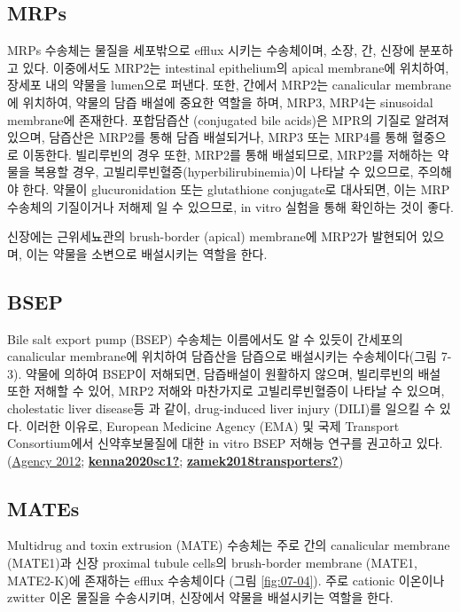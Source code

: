 \documentclass[
  11pt,
  krantz2, a4paper, twoside]{krantz}
\begin{document}
\hypertarget{mrps}{%
\subsection{MRPs}\label{mrps}}

MRPs 수송체는 물질을 세포밖으로 efflux 시키는 수송체이며, 소장, 간,
신장에 분포하고 있다. 이중에서도 MRP2는 intestinal epithelium의 apical
membrane에 위치하여, 장세포 내의 약물을 lumen으로 퍼낸다. 또한, 간에서
MRP2는 canalicular membrane에 위치하여, 약물의 담즙 배설에 중요한 역할을
하며, MRP3, MRP4는 sinusoidal membrane에 존재한다. 포합담즙산
(conjugated bile acids)은 MPR의 기질로 알려져 있으며, 담즙산은 MRP2를
통해 담즙 배설되거나, MRP3 또는 MRP4를 통해 혈중으로 이동한다.
빌리루빈의 경우 또한, MRP2를 통해 배설되므로, MRP2를 저해하는 약물을
복용할 경우, 고빌리루빈혈증(hyperbilirubinemia)이 나타날 수 있으므로,
주의해야 한다. 약물이 glucuronidation 또는 glutathione conjugate로
대사되면, 이는 MRP 수송체의 기질이거나 저해제 일 수 있으므로, in vitro
실험을 통해 확인하는 것이 좋다.

신장에는 근위세뇨관의 brush-border (apical) membrane에 MRP2가 발현되어
있으며, 이는 약물을 소변으로 배설시키는 역할을 한다.

\hypertarget{bsep}{%
\subsection{BSEP}\label{bsep}}

Bile salt export pump (BSEP) 수송체는 이름에서도 알 수 있듯이 간세포의
canalicular membrane에 위치하여 담즙산을 담즙으로 배설시키는
수송체이다(그림 7-3). 약물에 의하여 BSEP이 저해되면, 담즙배설이 원활하지
않으며, 빌리루빈의 배설 또한 저해할 수 있어, MRP2 저해와 마찬가지로
고빌리루빈혈증이 나타날 수 있으며, cholestatic liver disease등 과 같이,
drug-induced liver injury (DILI)를 일으킬 수 있다. 이러한 이유로,
European Medicine Agency (EMA) 및 국제 Transport Consortium에서
신약후보물질에 대한 in vitro BSEP 저해능 연구를 권고하고 있다. (\protect\hyperlink{ref-european2012guideline}{Agency 2012}; \protect\hyperlink{ref-kenna2020sc1}{\textbf{kenna2020sc1?}}; \protect\hyperlink{ref-zamek2018transporters}{\textbf{zamek2018transporters?}})

\hypertarget{mates}{%
\subsection{MATEs}\label{mates}}

Multidrug and toxin extrusion (MATE) 수송체는 주로 간의 canalicular
membrane (MATE1)과 신장 proximal tubule cells의 brush-border membrane
(MATE1, MATE2-K)에 존재하는 efflux 수송체이다 (그림 \ref{fig:07-04}). 주로 cationic
이온이나 zwitter 이온 물질을 수송시키며, 신장에서 약물을 배설시키는
역할을 한다.
\end{document}
